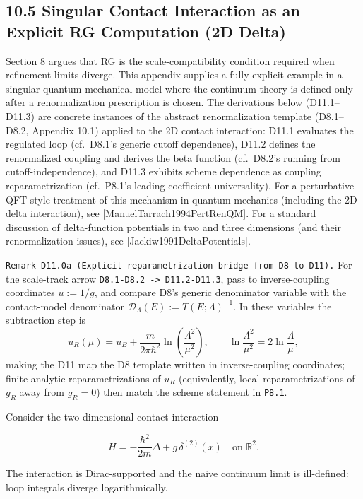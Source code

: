 \documentclass[
]{article}
\begin{document}
\hypertarget{singular-contact-interaction-as-an-explicit-rg-computation-2d-delta}{%
\subsection{10.5 Singular Contact Interaction as an Explicit RG
Computation (2D
Delta)}\label{singular-contact-interaction-as-an-explicit-rg-computation-2d-delta}}

Section 8 argues that RG is the scale-compatibility condition required
when refinement limits diverge. This appendix supplies a fully explicit
example in a singular quantum-mechanical model where the continuum
theory is defined only after a renormalization prescription is chosen.
The derivations below (D11.1--D11.3) are concrete instances of the
abstract renormalization template (D8.1--D8.2, Appendix 10.1) applied to
the 2D contact interaction: D11.1 evaluates the regulated loop
(cf.~D8.1's generic cutoff dependence), D11.2 defines the renormalized
coupling and derives the beta function (cf.~D8.2's running from
cutoff-independence), and D11.3 exhibits scheme dependence as coupling
reparametrization (cf.~P8.1's leading-coefficient universality). For a
perturbative-QFT-style treatment of this mechanism in quantum mechanics
(including the 2D delta interaction), see
{[}ManuelTarrach1994PertRenQM{]}. For a standard discussion of
delta-function potentials in two and three dimensions (and their
renormalization issues), see {[}Jackiw1991DeltaPotentials{]}.

\texttt{Remark\ D11.0a\ (Explicit\ reparametrization\ bridge\ from\ D8\ to\ D11).}
For the scale-track arrow
\texttt{D8.1-D8.2\ -\textgreater{}\ D11.2-D11.3}, pass to
inverse-coupling coordinates \(u:=1/g\), and compare D8's generic
denominator variable with the contact-model denominator
\(\mathcal D_\Lambda(E):=T(E;\Lambda)^{-1}\). In these variables the
subtraction step is \[
u_R(\mu)=u_B+\frac{m}{2\pi\hbar^2}\ln\!\left(\frac{\Lambda^2}{\mu^2}\right),\qquad \ln\!\frac{\Lambda^2}{\mu^2}=2\ln\!\frac{\Lambda}{\mu},
\] making the D11 map the D8 template written in inverse-coupling
coordinates; finite analytic reparametrizations of \(u_R\)
(equivalently, local reparametrizations of \(g_R\) away from \(g_R=0\))
then match the scheme statement in \texttt{P8.1}.

Consider the two-dimensional contact interaction

\[
H
=
-\frac{\hbar^2}{2m}\Delta
+g\,\delta^{(2)}(x)
\quad \text{on }\mathbb R^2.
\]

The interaction is Dirac-supported and the naive continuum limit is
ill-defined: loop integrals diverge logarithmically.
\end{document}
